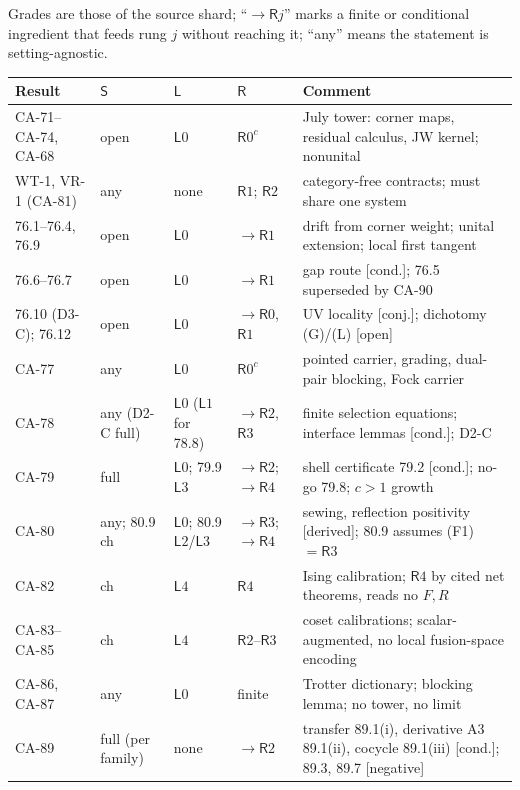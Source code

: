 Grades are those of the source shard; ``\(\to\mathsf Rj\)'' marks a finite or conditional ingredient that feeds rung
\(j\) without reaching it; ``any'' means the statement is setting-agnostic.
\begin{center}\footnotesize
\begin{tabular}{p{2.5cm}p{1.2cm}p{1.2cm}p{1.6cm}p{7.3cm}}
\toprule
Result & \(\mathsf S\) & \(\mathsf L\) & \(\mathsf R\) & Comment \\
\midrule
CA-71--CA-74, CA-68 & open & \(\mathsf L0\) & \(\mathsf R0^{c}\) & July tower: corner maps, residual calculus, JW kernel; nonunital \\
WT-1, VR-1 (CA-81) & any & none & \(\mathsf R1\); \(\mathsf R2\) & category-free contracts; must share one system \\
76.1--76.4, 76.9 & open & \(\mathsf L0\) & \(\to\mathsf R1\) & drift from corner weight; unital extension; local first tangent \\
76.6--76.7 & open & \(\mathsf L0\) & \(\to\mathsf R1\) & gap route [cond.]; 76.5 superseded by CA-90 \\
76.10 (D3-C); 76.12 & open & \(\mathsf L0\) & \(\to\mathsf R0\), \(\mathsf R1\) & UV locality [conj.]; dichotomy (G)/(L) [open] \\
CA-77 & any & \(\mathsf L0\) & \(\mathsf R0^c\) & pointed carrier, grading, dual-pair blocking, Fock carrier \\
CA-78 & any (D2-C full) & \(\mathsf L0\) (\(\mathsf L1\) for 78.8) & \(\to\mathsf R2\), \(\mathsf R3\) & finite selection equations; interface lemmas [cond.]; D2-C \\
CA-79 & full & \(\mathsf L0\); 79.9 \(\mathsf L3\) & \(\to\mathsf R2\); \(\to\mathsf R4\) & shell certificate 79.2 [cond.]; no-go 79.8; \(c>1\) growth \\
CA-80 & any; 80.9 ch & \(\mathsf L0\); 80.9 \(\mathsf L2\)/\(\mathsf L3\) & \(\to\mathsf R3\); \(\to\mathsf R4\) & sewing, reflection positivity [derived]; 80.9 assumes (F1)\(=\mathsf R3\) \\
CA-82 & ch & \(\mathsf L4\) & \(\mathsf R4\) & Ising calibration; \(\mathsf R4\) by cited net theorems, reads no \(F,R\) \\
CA-83--CA-85 & ch & \(\mathsf L4\) & \(\mathsf R2\)--\(\mathsf R3\) & coset calibrations; scalar-augmented, no local fusion-space encoding \\
CA-86, CA-87 & any & \(\mathsf L0\) & finite & Trotter dictionary; blocking lemma; no tower, no limit \\
CA-89 & full (per family) & none & \(\to\mathsf R2\) & transfer 89.1(i), derivative A3 89.1(ii), cocycle 89.1(iii) [cond.]; 89.3, 89.7 [negative] \\

\end{tabular}
\end{center}
